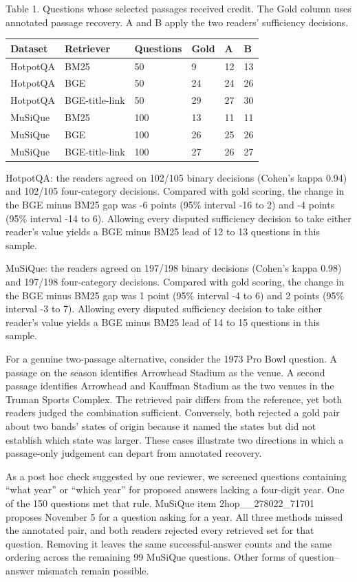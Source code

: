 \documentclass[11pt]{article}
\begin{document}
Table 1. Questions whose selected passages received credit. The Gold column uses annotated passage recovery. A and B apply the two readers' sufficiency decisions.

\begin{center}\small\begin{tabular}{llllll}\toprule
Dataset & Retriever & Questions & Gold & A & B \\ \midrule
HotpotQA & BM25 & 50 & 9 & 12 & 13 \\
HotpotQA & BGE & 50 & 24 & 24 & 26 \\
HotpotQA & BGE-title-link & 50 & 29 & 27 & 30 \\
MuSiQue & BM25 & 100 & 13 & 11 & 11 \\
MuSiQue & BGE & 100 & 26 & 25 & 26 \\
MuSiQue & BGE-title-link & 100 & 27 & 26 & 27 \\
\bottomrule\end{tabular}\end{center}
HotpotQA: the readers agreed on 102/105 binary decisions (Cohen's kappa 0.94) and 102/105 four-category decisions. Compared with gold scoring, the change in the BGE minus BM25 gap was -6 points (95\% interval -16 to 2) and -4 points (95\% interval -14 to 6). Allowing every disputed sufficiency decision to take either reader's value yields a BGE minus BM25 lead of 12 to 13 questions in this sample.

MuSiQue: the readers agreed on 197/198 binary decisions (Cohen's kappa 0.98) and 197/198 four-category decisions. Compared with gold scoring, the change in the BGE minus BM25 gap was 1 point (95\% interval -4 to 6) and 2 points (95\% interval -3 to 7). Allowing every disputed sufficiency decision to take either reader's value yields a BGE minus BM25 lead of 14 to 15 questions in this sample.

For a genuine two-passage alternative, consider the 1973 Pro Bowl question. A passage on the season identifies Arrowhead Stadium as the venue. A second passage identifies Arrowhead and Kauffman Stadium as the two venues in the Truman Sports Complex. The retrieved pair differs from the reference, yet both readers judged the combination sufficient. Conversely, both rejected a gold pair about two bands' states of origin because it named the states but did not establish which state was larger. These cases illustrate two directions in which a passage-only judgement can depart from annotated recovery.

As a post hoc check suggested by one reviewer, we screened questions containing “what year” or “which year” for proposed answers lacking a four-digit year. One of the 150 questions met that rule. MuSiQue item 2hop\_\_278022\_71701 proposes November 5 for a question asking for a year. All three methods missed the annotated pair, and both readers rejected every retrieved set for that question. Removing it leaves the same successful-answer counts and the same ordering across the remaining 99 MuSiQue questions. Other forms of question--answer mismatch remain possible.
\end{document}
